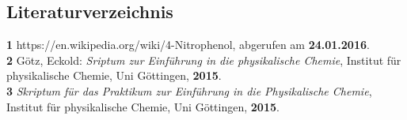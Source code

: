 \documentclass[12pt,a4paper,titlepage,headinclude,bibtotoc]{scrartcl}
\begin{document}
\newpage
\subsection{Literaturverzeichnis}
\textbf{1} https://en.wikipedia.org/wiki/4-Nitrophenol, abgerufen am \textbf{24.01.2016}.\\
\textbf{2} Götz, Eckold: \emph{Sriptum zur Einführung in die physikalische Chemie}, Institut für physikalische Chemie, Uni Göttingen, \textbf{2015}.\\
\textbf{3} \emph{Skriptum für das Praktikum zur Einführung in die Physikalische Chemie}, Institut für physikalische Chemie, Uni Göttingen, \textbf{2015}.\\
\end{document}
